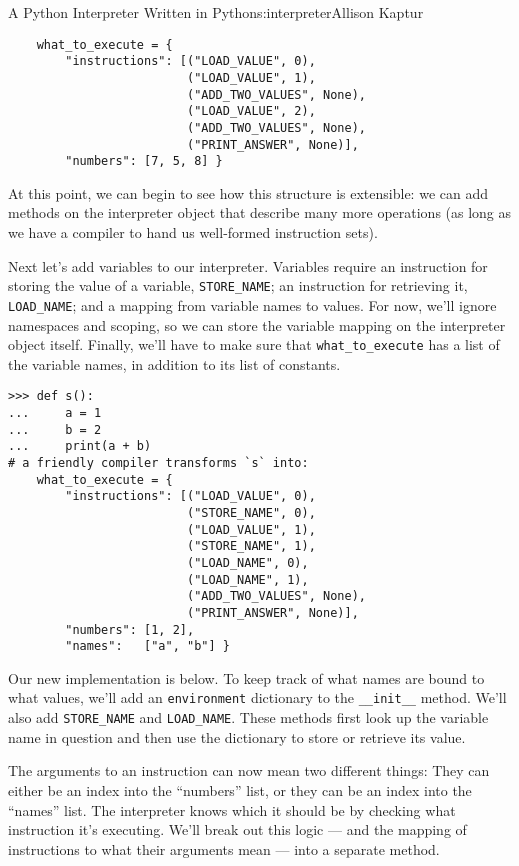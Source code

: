 \begin{aosachapter}{A Python Interpreter Written in Python}{s:interpreter}{Allison Kaptur}
\begin{verbatim}
    what_to_execute = {
        "instructions": [("LOAD_VALUE", 0),
                         ("LOAD_VALUE", 1),
                         ("ADD_TWO_VALUES", None),
                         ("LOAD_VALUE", 2),
                         ("ADD_TWO_VALUES", None),
                         ("PRINT_ANSWER", None)],
        "numbers": [7, 5, 8] }
\end{verbatim}

At this point, we can begin to see how this structure is extensible: we
can add methods on the interpreter object that describe many more
operations (as long as we have a compiler to hand us well-formed
instruction sets).

\label{variables}

Next let's add variables to our interpreter. Variables require an
instruction for storing the value of a variable, \texttt{STORE\_NAME};
an instruction for retrieving it, \texttt{LOAD\_NAME}; and a mapping
from variable names to values. For now, we'll ignore namespaces and
scoping, so we can store the variable mapping on the interpreter object
itself. Finally, we'll have to make sure that \texttt{what\_to\_execute}
has a list of the variable names, in addition to its list of constants.

\begin{verbatim}
>>> def s():
...     a = 1
...     b = 2
...     print(a + b)
# a friendly compiler transforms `s` into:
    what_to_execute = {
        "instructions": [("LOAD_VALUE", 0),
                         ("STORE_NAME", 0),
                         ("LOAD_VALUE", 1),
                         ("STORE_NAME", 1),
                         ("LOAD_NAME", 0),
                         ("LOAD_NAME", 1),
                         ("ADD_TWO_VALUES", None),
                         ("PRINT_ANSWER", None)],
        "numbers": [1, 2],
        "names":   ["a", "b"] }
\end{verbatim}

Our new implementation is below. To keep track of what names are bound
to what values, we'll add an \texttt{environment} dictionary to the
\texttt{\_\_init\_\_} method. We'll also add \texttt{STORE\_NAME} and
\texttt{LOAD\_NAME}. These methods first look up the variable name in
question and then use the dictionary to store or retrieve its value.

The arguments to an instruction can now mean two different things: They
can either be an index into the ``numbers'' list, or they can be an
index into the ``names'' list. The interpreter knows which it should be
by checking what instruction it's executing. We'll break out this logic
--- and the mapping of instructions to what their arguments mean ---
into a separate method.


\end{aosachapter}
